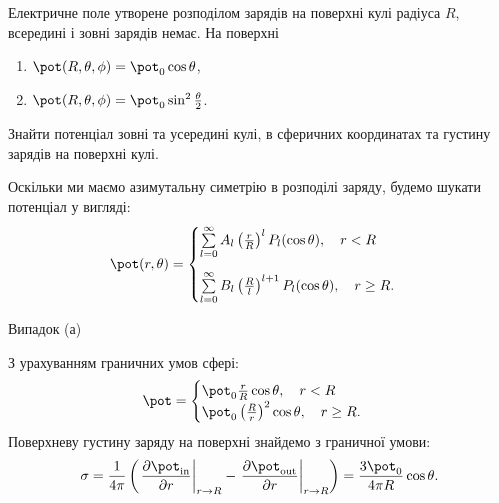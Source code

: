 \begin{problem}
Електричне поле утворене розподілом зарядів на поверхні кулі радіуса $R$, всередині і зовні зарядів немає. На поверхні
\begin{enumerate}[label=\alph*)]
	\item $\pot(R, \theta, \phi) = \pot_0\cos\theta$,
	\item $\pot(R, \theta, \phi) = \pot_0\sin^2\frac\theta2$.
\end{enumerate}
Знайти потенціал зовні та усередині кулі, в сферичних координатах та густину зарядів на поверхні кулі.
\begin{solution}
	Оскільки ми маємо азимутальну симетрію в розподілі заряду, будемо шукати потенціал у вигляді:
	\begin{equation}
		\pot(r, \theta) = \begin{cases}
			\sum\limits_{l=0}^{\infty}A_l \left( \frac{r}{R}\right)^l P_l(\cos\theta), \quad r<R \\[1.5em]
			\sum\limits_{l=0}^{\infty}B_l \left( \frac{R}{l}\right)^{l+1} P_l(\cos\theta), \quad r \ge R.
		\end{cases}
	\end{equation}

	Випадок (а)

	З урахуванням граничних умов сфері:
	\begin{equation}
		\pot = \begin{cases}
			\pot_0\frac{r}{R} \cos\theta, \quad r<R \\
			\pot_0\left( \frac{R}{r}\right)^2 \cos\theta, \quad r \ge R.
		\end{cases}
	\end{equation}
	Поверхневу густину заряду на поверхні знайдемо з граничної умови:
	\begin{equation}
		\sigma = \frac{1}{4\pi} \left( \left. \frac{\partial \pot_{\mathrm{in}}}{\partial r}\right|_{r \to R} - \left. \frac{\partial \pot_{\mathrm{out}}}{\partial r}\right|_{r \to R} \right) =  \frac{3\pot_0}{4\pi R} \cos\theta.
	\end{equation}
\end{solution}
\end{problem}

